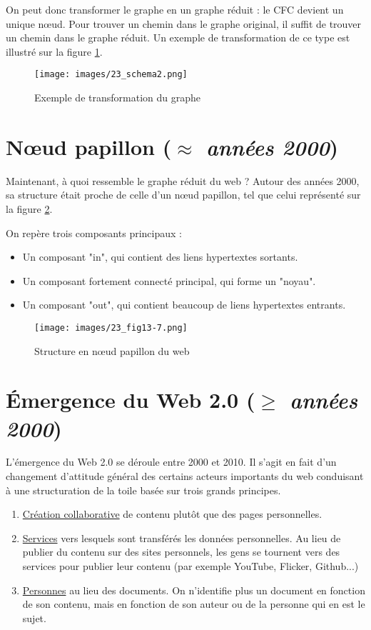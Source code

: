 On peut donc transformer le graphe en un graphe réduit : le CFC devient un unique nœud. Pour trouver un chemin dans le graphe original, il suffit de trouver un chemin dans le graphe réduit.
Un exemple de transformation de ce type est illustré sur la figure \ref{cfc_transformation}.
\vspace{0.3cm}

\begin{figure}[!ht]
\centering
\texttt{[image: images/23\_schema2.png]}
\caption{Exemple de transformation du graphe}
\label{cfc_transformation}
\end{figure}


\section{Nœud papillon (\textit{$\approx$ années 2000})}
	Maintenant, à quoi ressemble le graphe réduit du web ? Autour des années 2000, sa structure était proche de celle d'un nœud papillon, tel que celui représenté sur la figure \ref{noeud_papillon}.
	
	On repère trois composants principaux :
	\begin{itemize}
	\item Un composant "in", qui contient des liens hypertextes sortants.
	\item Un composant fortement connecté principal, qui forme un "noyau".
	\item Un composant "out", qui contient beaucoup de liens hypertextes entrants.
	\end{itemize}
	
	\begin{figure}[!ht]
		\centering
		\texttt{[image: images/23\_fig13-7.png]}
		\caption{Structure en nœud papillon du web}
		\label{noeud_papillon}
	\end{figure}

\section{Émergence du Web 2.0 (\textit{$\ge$ années 2000})}
L'émergence du Web 2.0 se déroule entre 2000 et 2010. Il s'agit en fait d'un changement d'attitude général des certains acteurs importants du web conduisant à une structuration de la toile basée sur trois grands principes. 
\begin{enumerate}
    \item \underline{Création collaborative} de contenu plutôt que des pages personnelles.
    \item \underline{Services} vers lesquels sont transférés les données personnelles. Au lieu de publier du contenu  sur des sites personnels, les gens se tournent vers des services pour publier leur contenu (par exemple YouTube, Flicker, Github...)
    \item \underline{Personnes} au lieu des documents. On n'identifie plus un document en fonction de son contenu, mais en fonction de son auteur ou de la personne qui en est le sujet.
\end{enumerate} 

